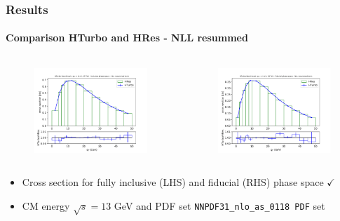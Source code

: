 \documentclass[aspectratio=43]{beamer}
\begin{document}
\begin{frame}
	
	\frametitle{Results}
	\framesubtitle{Comparison HTurbo and HRes - NLL resummed}
	
	\footnotesize
	
	\begin{columns}
		
		
		\begin{figure}
			\includegraphics[width = 7cm]{plots/part3/chapter6/nlo-res-1.png}
		\end{figure}
		
		
		\begin{figure}
			\includegraphics[width = 7cm]{plots/part3/chapter6/nlo-res-fid-1.png}
		\end{figure}
		
	\end{columns}
	
	\begin{itemize}
		\item Cross section for fully inclusive (LHS) and fiducial (RHS) phase space {\color{darkgreen}$\checkmark$} 
		\item CM energy $\sqrt s = 13$ GeV and PDF set \texttt{NNPDF31\_nlo\_as\_0118 PDF} set
	\end{itemize}

\end{frame}
\end{document}
